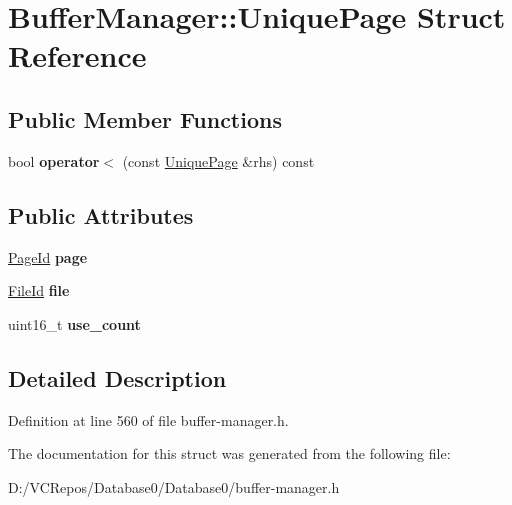 \hypertarget{struct_buffer_manager_1_1_unique_page}{}\section{Buffer\+Manager\+::Unique\+Page Struct Reference}
\label{struct_buffer_manager_1_1_unique_page}
\subsection*{Public Member Functions}
\begin{DoxyCompactItemize}
\item 
\mbox{\label{struct_buffer_manager_1_1_unique_page_a8deaea0a6aa4a92ffc9646b95aee3e6d}} 
bool {\bfseries operator$<$} (const \mbox{\hyperlink{struct_buffer_manager_1_1_unique_page}{Unique\+Page}} \&rhs) const
\end{DoxyCompactItemize}
\subsection*{Public Attributes}
\begin{DoxyCompactItemize}
\item 
\mbox{\label{struct_buffer_manager_1_1_unique_page_a9ee87d3742240a0ea685dbe18e7a37b3}} 
\mbox{\hyperlink{struct_generic_i_o_id}{Page\+Id}} {\bfseries page}
\item 
\mbox{\label{struct_buffer_manager_1_1_unique_page_aa5b5bf8a83b05dbf0e6ae0f2a2964e86}} 
\mbox{\hyperlink{struct_generic_i_o_id}{File\+Id}} {\bfseries file}
\item 
\mbox{\label{struct_buffer_manager_1_1_unique_page_ae3bde658d6e5b2167dd54bd45dbe9522}} 
uint16\+\_\+t {\bfseries use\+\_\+count}
\end{DoxyCompactItemize}


\subsection{Detailed Description}


Definition at line 560 of file buffer-\/manager.\+h.



The documentation for this struct was generated from the following file\+:\begin{DoxyCompactItemize}
\item 
D\+:/\+V\+C\+Repos/\+Database0/\+Database0/buffer-\/manager.\+h\end{DoxyCompactItemize}
